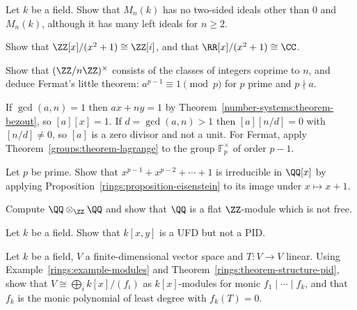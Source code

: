 \begin{exercise}\label{rings:exercise-matrix-ring-simple}
Let $k$ be a field. Show that $M_n(k)$ has no two-sided ideals other than $0$ and
$M_n(k)$, although it has many left ideals for $n \geq 2$.
\end{exercise}

\begin{exercise}\label{rings:exercise-gaussian-quotient}
Show that $\ZZ[x]/(x^2 + 1) \cong \ZZ[i]$, and that $\RR[x]/(x^2 + 1) \cong \CC$.
\end{exercise}

\begin{exercise}\label{rings:exercise-units-mod-n}
Show that $(\ZZ/n\ZZ)^\times$ consists of the classes of integers coprime to $n$, and
deduce Fermat's little theorem: $a^{p-1} \equiv 1 \pmod p$ for $p$ prime and $p \nmid a$.
\end{exercise}

\begin{solution}
If $\gcd(a, n) = 1$ then $ax + ny = 1$ by Theorem~\ref{number-systems:theorem-bezout}, so
$[a][x] = 1$. If $d = \gcd(a, n) > 1$ then $[a][n/d] = 0$ with $[n/d] \neq 0$, so $[a]$ is a zero
divisor and not a unit. For Fermat, apply Theorem~\ref{groups:theorem-lagrange} to the group
$\mathbb{F}_p^\times$ of order $p - 1$.
\end{solution}

\begin{exercise}\label{rings:exercise-cyclotomic-irreducible}
Let $p$ be prime. Show that $x^{p-1} + x^{p-2} + \cdots + 1$ is irreducible in $\QQ[x]$ by applying
Proposition~\ref{rings:proposition-eisenstein} to its image under $x \mapsto x + 1$.
\end{exercise}

\begin{exercise}\label{rings:exercise-rationals-tensor}
Compute $\QQ \otimes_\ZZ \QQ$ and show that $\QQ$ is a flat $\ZZ$-module which is not free.
\end{exercise}

\begin{exercise}\label{rings:exercise-two-variables-not-pid}
Let $k$ be a field. Show that $k[x, y]$ is a UFD but not a PID.
\end{exercise}

\begin{exercise}\label{rings:exercise-jordan-preview}
Let $k$ be a field, $V$ a finite-dimensional vector space and $T \colon V \to V$ linear. Using
Example~\ref{rings:example-modules} and Theorem~\ref{rings:theorem-structure-pid}, show that
$V \cong \bigoplus_i k[x]/(f_i)$ as $k[x]$-modules for monic $f_1 \mid \cdots \mid f_k$, and that $f_k$ is
the monic polynomial of least degree with $f_k(T) = 0$.
\end{exercise}
